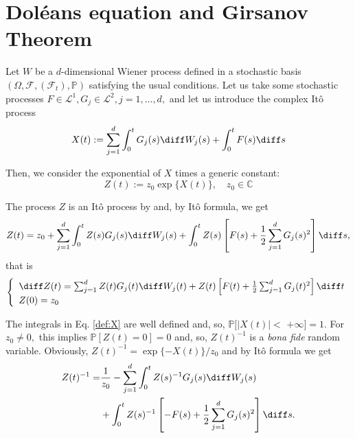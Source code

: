 \section{Doléans equation and Girsanov Theorem}

Let $W$ be a $ d $-dimensional Wiener process defined in a stochastic basis $\left(\Omega, \mathcal{F},\left(\mathcal{F}_{t}\right), \mathbb{P}\right)$ satisfying the usual conditions.
Let us take some stochastic processes $F \in \mathcal{L}^{1}, G_{j} \in \mathcal{L}^{2}, j=1, \ldots, d,$ and let us introduce the complex Itô process
\begin{equation}\label{def:X}
 X(t):=\sum_{j=1}^{d} \int_{0}^{t} G_{j}(s) \diff W_{j}(s)+\int_{0}^{t} F(s) \diff s
\end{equation}

Then, we consider the exponential of $X$ times a generic constant:
\begin{equation}\label{def:Z}
 Z(t):=z_{0} \exp \{X(t)\}, \quad z_{0} \in \mathbb{C}
\end{equation}

The process $Z$ is an Itô process by and, by Itô formula, we get  \begin{equation}\label{eq:expression_Z}
Z(t)=z_{0}+\sum_{j=1}^{d} \int_{0}^{t} Z(s) G_{j}(s) \diff W_{j}(s)+\int_{0}^{t} Z(s)\left[F(s)+\frac{1}{2} \sum_{j=1}^{d} G_{j}(s)^{2}\right] \diff s,
\end{equation}
that is
\begin{equation}\label{eq:dolean_equation}
\left\{\begin{array}{l}\diff Z(t)=\sum_{j=1}^{d} Z(t) G_{j}(t) \diff W_{j}(t)+Z(t)\left[F(t)+\frac{1}{2} \sum_{j=1}^{d} G_{j}(t)^{2}\right] \diff t \\ Z(0)=z_{0}\end{array}\right.
\end{equation}

The integrals in Eq. \eqref{def:X} are well defined and, so, $\mathbb{P}[|X(t)|<$ $+\infty]=1 .$ For $z_{0} \neq 0,$ this implies $\mathbb{P}[Z(t)=0]=0$ and, so, $Z(t)^{-1}$ is a \textit{bona fide} random variable. Obviously, $Z(t)^{-1}=\exp \{-X(t)\} / z_{0}$ and by Itô formula we get
\begin{equation}\label{eq:Z^-1}
\begin{aligned} Z(t)^{-1}=& \frac{1}{z_{0}}-\sum_{j=1}^{d} \int_{0}^{t} Z(s)^{-1} G_{j}(s) \diff W_{j}(s) \\ &+\int_{0}^{t} Z(s)^{-1}\left[-F(s)+\frac{1}{2} \sum_{j=1}^{d} G_{j}(s)^{2}\right] \diff s . \end{aligned}
\end{equation}

